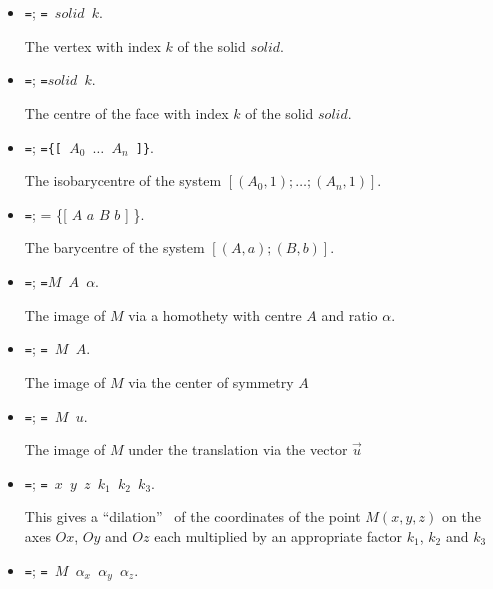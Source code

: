 \begin{itemize}

\item \texttt{=};
\texttt{= $solid$ $k$}.

The vertex with index $k$ of the solid $solid$.

\item \texttt{=};
\texttt{=$solid$ $k$}.

The centre of the face with index $k$ of the solid $solid$.

\item \texttt{=};
\texttt{=\{[ $A_0$ $\ldots $ $A_{n}$ ]\}}. 

   {The isobarycentre of the system $[(A_0, 1);
   \ldots ; (A_n, 1)]$.}

\item \texttt{=};
=  \{[ $A$ $a$ $B$ $b$ ] \}.

   {The barycentre of the system $[(A, a) ; (B, b)]$.}

\item \texttt{=};
\texttt{={$M$ $A$ $\alpha $}}.

   {The image of $M$ via a homothety with centre $A$ and ratio $\alpha $.}

\item \texttt{=};
\texttt{= {$M$ $A$}}.

   {The image of $M$ via the center of symmetry $A$}%

\item \texttt{=};
\texttt{=   {$M$ $u$}}.

   {The image of $M$ under the translation via the vector $\vec u$}

\item \texttt{=};
\texttt{= {$x$ $y$ $z$  $k_1$ $k_2$ $k_3$}}.

   {This gives a ``dilation'' \ of the coordinates of the point $M (x, y,
   z)$ on the axes $Ox$, $Oy$ and $Oz$ each multiplied by an appropriate factor $k_1$,
   $k_2$ and $k_3$}

\item \texttt{=};
\texttt{= {$M$ $\alpha_x$ $\alpha_y$ $\alpha_z$}}.


\end{itemize}

